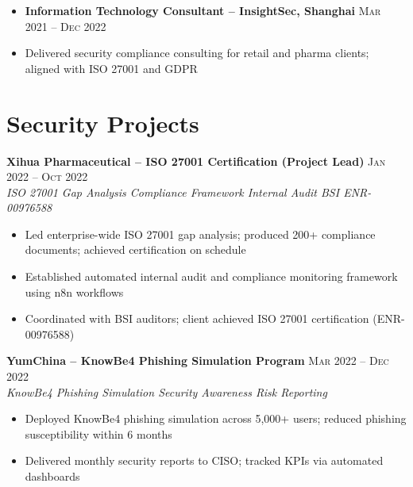 \documentclass{simpleresume}
\begin{document}
\vspace{0.06cm}
\begin{itemize}
  \item\textbf{Information Technology Consultant -- InsightSec, Shanghai}
    \hfill{\sffamily\scshape\small\color{muted}Mar 2021 -- Dec 2022}
  \item Delivered security compliance consulting for retail and pharma clients; aligned with ISO 27001 and GDPR
\end{itemize}
\section{Security Projects}
\noindent\textbf{Xihua Pharmaceutical -- ISO 27001 Certification (Project Lead)}
  \hfill{\sffamily\scshape\small\color{muted}Jan 2022 -- Oct 2022}\\
  {\itshape\color{accent}\footnotesize ISO 27001 \quad\textbullet\quad Gap Analysis \quad\textbullet\quad Compliance Framework \quad\textbullet\quad Internal Audit \quad\textbullet\quad BSI ENR-00976588}
\vspace{-0.25mm}
\begin{itemize}
  \item Led enterprise-wide ISO 27001 gap analysis; produced 200+ compliance documents; achieved certification on schedule\hidewidth
  \item Established automated internal audit and compliance monitoring framework using n8n workflows
  \item Coordinated with BSI auditors; client achieved ISO 27001 certification (ENR-00976588)
\end{itemize}

\vspace{0.06cm}
\noindent\textbf{YumChina -- KnowBe4 Phishing Simulation Program}
  \hfill{\sffamily\scshape\small\color{muted}Mar 2022 -- Dec 2022}\\
  {\itshape\color{accent}\footnotesize KnowBe4 \quad\textbullet\quad Phishing Simulation \quad\textbullet\quad Security Awareness \quad\textbullet\quad Risk Reporting}
\vspace{-0.25mm}
\begin{itemize}
  \item Deployed KnowBe4 phishing simulation across 5,000+ users; reduced phishing susceptibility within 6 months
  \item Delivered monthly security reports to CISO; tracked KPIs via automated dashboards
\end{itemize}
\end{document}
